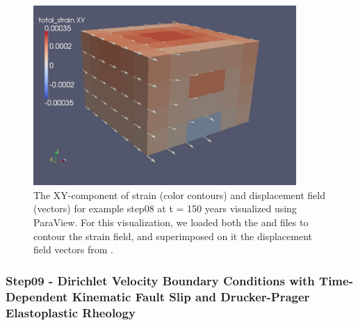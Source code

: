 \begin{figure}
  \includegraphics[width=10cm]{examples/figs/3dhex8_step08-strain-displ-t150}
  \caption{The XY-component of strain (color contours) and displacement field
    (vectors) for example step08 at t = 150 years visualized using ParaView.
    For this visualization, we loaded both the 
    and  files to contour the strain field,
    and superimposed on it the displacement field vectors from .}
  \label{fig:example:3dhex8:step8:displacement}
\end{figure}


\subsubsection{Step09 - Dirichlet Velocity Boundary Conditions with Time-Dependent
Kinematic Fault Slip and Drucker-Prager Elastoplastic Rheology}

